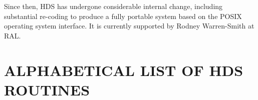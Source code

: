 \documentclass[twoside,11pt]{article}
\newcommand{\xlabel}[1]{}
\renewcommand{\_}{\texttt{\symbol{95}}}
\begin{document}
Since then, HDS has undergone considerable internal change, including
substantial re-coding to produce a fully portable system based on the
POSIX operating system interface. It is currently supported by Rodney
Warren-Smith at RAL.

\appendix

\newpage
\section{\xlabel{alphabetical_list_of_routines}\label{appendix:alphalist}ALPHABETICAL LIST OF HDS ROUTINES}

\end{document}

